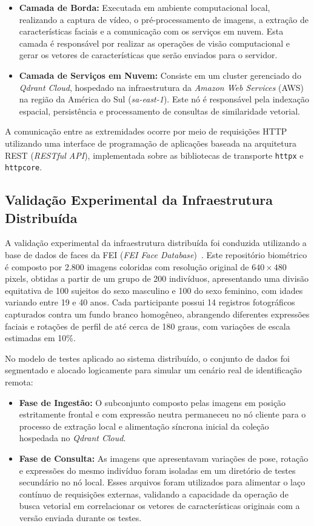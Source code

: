 \begin{itemize}
    \item \textbf{Camada de Borda:} Executada em ambiente computacional local, realizando a captura de vídeo, o pré-processamento de imagens, a extração de características faciais e a comunicação com os serviços em nuvem. Esta camada é responsável por realizar as operações de visão computacional e gerar os vetores de características que serão enviados para o servidor.
    \item \textbf{Camada de Serviços em Nuvem:} Consiste em um cluster gerenciado do \textit{Qdrant Cloud}, hospedado na infraestrutura da \textit{Amazon Web Services} (AWS) na região da América do Sul (\textit{sa-east-1}). Este nó é responsável pela indexação espacial, persistência e processamento de consultas de similaridade vetorial.
\end{itemize}

A comunicação entre as extremidades ocorre por meio de requisições HTTP utilizando uma interface de programação de aplicações baseada na arquitetura REST (\textit{RESTful API}), implementada sobre as bibliotecas de transporte \texttt{httpx} e \texttt{httpcore}.

\subsection{Validação Experimental da Infraestrutura Distribuída}
A validação experimental da infraestrutura distribuída foi conduzida utilizando a base de dados de faces da FEI (\textit{FEI Face Database})~\cite{thomaz2006fei}. Este repositório biométrico é composto por 2.800 imagens coloridas com resolução original de $640 \times 480$ pixels, obtidas a partir de um grupo de 200 indivíduos, apresentando uma divisão equitativa de 100 sujeitos do sexo masculino e 100 do sexo feminino, com idades variando entre 19 e 40 anos. Cada participante possui 14 registros fotográficos capturados contra um fundo branco homogêneo, abrangendo diferentes expressões faciais e rotações de perfil de até cerca de 180 graus, com variações de escala estimadas em 10\%.

No modelo de testes aplicado ao sistema distribuído, o conjunto de dados foi segmentado e alocado logicamente para simular um cenário real de identificação remota:

\begin{itemize}
    \item \textbf{Fase de Ingestão:} O subconjunto composto pelas imagens em posição estritamente frontal e com expressão neutra permaneceu no nó cliente para o processo de extração local e alimentação síncrona inicial da coleção hospedada no \textit{Qdrant Cloud}.
    \item \textbf{Fase de Consulta:} As imagens que apresentavam variações de pose, rotação e expressões do mesmo indivíduo foram isoladas em um diretório de testes secundário no nó local. Esses arquivos foram utilizados para alimentar o laço contínuo de requisições externas, validando a capacidade da operação de busca vetorial em correlacionar os vetores de características originais com a versão enviada durante os testes.
\end{itemize}

